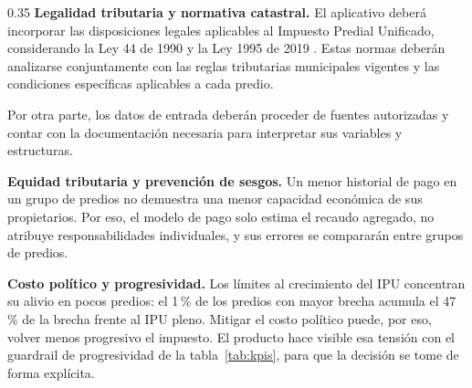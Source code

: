 \documentclass[12pt,letterpaper]{article}
\begin{document}
\begin{espacio}{0.35}
\textbf{Legalidad tributaria y normativa catastral.} El aplicativo deberá incorporar las disposiciones legales aplicables al Impuesto Predial Unificado, 
considerando la Ley 44 de 1990 y la Ley 1995 de 2019 \cite{ley44,ley1995_2019}. Estas normas deberán analizarse conjuntamente con 
las reglas tributarias municipales vigentes y las condiciones específicas aplicables a cada predio.

Por otra parte, los datos de entrada deberán proceder de fuentes autorizadas y contar con la documentación
necesaria para interpretar sus variables y estructuras.

\textbf{Equidad tributaria y prevención de sesgos.} Un menor historial de pago en un grupo de
predios no demuestra una menor capacidad económica de sus propietarios. Por eso, el modelo de
pago solo estima el recaudo agregado, no atribuye responsabilidades individuales, y sus errores
se compararán entre grupos de predios.

\textbf{Costo político y progresividad.} Los límites al crecimiento del IPU concentran su alivio en pocos predios: el 1\,\% de los
predios con mayor brecha acumula el 47\,\% de la brecha frente al IPU pleno. Mitigar el costo
político puede, por eso, volver menos progresivo el impuesto. El producto hace visible esa
tensión con el guardrail de progresividad de la tabla~\ref{tab:kpis}, para que la decisión se
tome de forma explícita.

\end{espacio}
\end{document}
